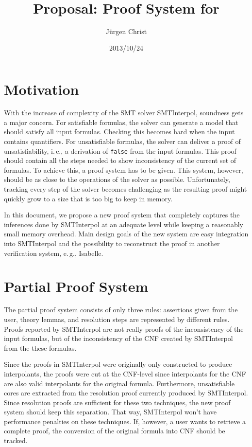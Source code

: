 \documentclass[a4paper]{article}
\title{Proposal: Proof System for \siv}
\author{J{\"u}rgen Christ}
\date{2013/10/24}
\newcommand\si{SMTInterpol\xspace}
\begin{document}
\maketitle
\section{Motivation}
With the increase of complexity of the SMT solver \si, soundness gets a major
concern.  For satisfiable formulas, the solver can generate a model that
should satisfy all input formulas.  Checking this becomes hard when the input
contains quantifiers.  For unsatisfiable formulas, the solver can deliver a
proof of unsatisfiability, i.\,e., a derivation of \texttt{false} from the
input formulas.  This proof should contain all the steps needed to show
inconsistency of the current set of formulas.  To achieve this, a proof system
has to be given.  This system, however, should be as close to the operations
of the solver as possible.  Unfortunately, tracking every step of the solver
becomes challenging as the resulting proof might quickly grow to a size that is
too big to keep in memory.

In this document, we propose a new proof system that completely captures the
inferences done by \si at an adequate level while keeping a reasonably small
memory overhead.  Main design goals of the new system are easy integration
into \si and the possibility to reconstruct the proof in another verification
system, e.\,g., Isabelle.

\section{Partial Proof System}
The partial proof system consists of only three rules: assertions given from
the user, theory lemmas, and resolution steps are represented by different
rules.  Proofs reported by \si are not really proofs of the inconsistency of
the input formulas, but of the inconsistency of the CNF created by \si from
the these formulas.

Since the proofs in \si were originally only constructed to produce
interpolants, the proofs were cut at the CNF-level since interpolants for
the CNF are also valid interpolants for the original formula.  Furthermore,
unsatisfiable cores are extracted from the resolution proof currently produced
by \si.  Since resolution proofs are sufficient for these two techniques, the
new proof system should keep this separation.  That way, \si won't have
performance penalties on these techniques.  If, however, a user wants to
retrieve a complete proof, the conversion of the original formula into CNF
should be tracked.
\end{document}
